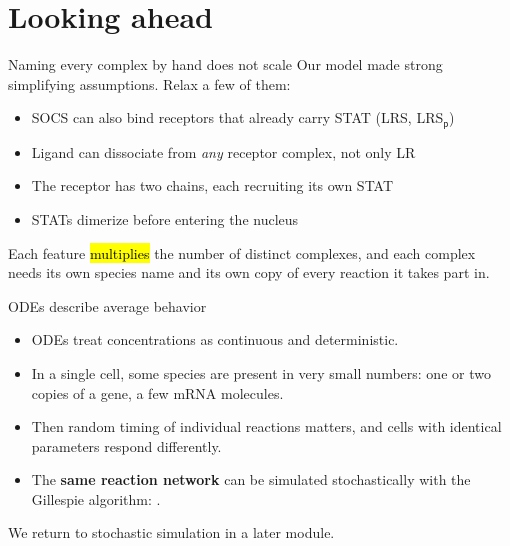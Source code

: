\documentclass[aspectratio=169,10pt,t]{beamer}
\begin{document}
\section{Looking ahead}

\begin{frame}{Naming every complex by hand does not scale}
  Our model made strong simplifying assumptions. Relax a few of them:
  \begin{itemize}[<+->]
    \item SOCS can also bind receptors that already carry STAT (LRS, LRS$_\mathsf{p}$)
    \item Ligand can dissociate from \emph{any} receptor complex, not only LR
    \item The receptor has two chains, each recruiting its own STAT
    \item STATs dimerize before entering the nucleus
  \end{itemize}
  \vskip2mm
  \onslide<+->
  Each feature \hl{multiplies} the number of distinct complexes, and each complex
  needs its own species name and its own copy of every reaction it takes part in.
  \onslide<+->
\end{frame}

\begin{frame}{ODEs describe average behavior}
  \begin{itemize}[<+->]
    \item ODEs treat concentrations as continuous and deterministic.
    \item In a single cell, some species are present in very small numbers:
          one or two copies of a gene, a few mRNA molecules.
    \item Then random timing of individual reactions matters, and cells with identical
          parameters respond differently.
    \item The \textbf{same reaction network} can be simulated stochastically with the
          Gillespie algorithm: .
  \end{itemize}
  \vskip2mm
  \onslide<+->
  {\color{fsGray} We return to stochastic simulation in a later module.}
\end{frame}
\end{document}

